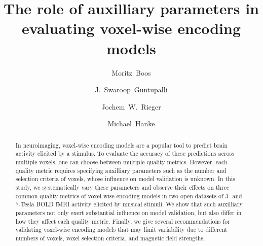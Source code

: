 
\newcommand{\beginsupplement}{%
        \setcounter{table}{0}
        \renewcommand{\thetable}{S\arabic{table}}%
        \setcounter{figure}{0}
        \renewcommand{\thefigure}{S\arabic{figure}}%
     }




\title{The role of auxilliary parameters in evaluating voxel-wise encoding models}


\author[1]{Moritz~Boos}
\author[2]{J.~Swaroop~Guntupalli}
\author[1]{Jochem~W.~Rieger}
\author[3,4]{Michael~Hanke}

\maketitle

\begin{abstract}
In neuroimaging, voxel-wise encoding models are a popular tool to predict brain activity elicited by a stimulus.
To evaluate the accuracy of these predictions across multiple voxels, one can choose between multiple quality metrics.
However, each quality metric requires specifying auxilliary parameters such as the number and selection criteria of voxels, whose influence on model validation is unknown.
In this study, we systematically vary these parameters and observe their effects on three common quality metrics of voxel-wise encoding models in two open datasets of 3- and 7-Tesla BOLD fMRI activity elicited by musical stimuli.
We show that such auxilliary parameters not only exert substantial influence on model validation, but also differ in how they affect each quality metric.
Finally, we give several recommendations for validating voxel-wise encoding models that may limit variability due to different numbers of voxels, voxel selection criteria, and magnetic field strengths.
\end{abstract}

\clearpage


